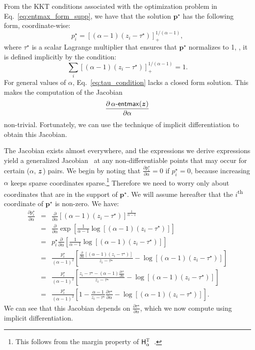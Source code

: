 From the KKT conditions associated with the optimization problem in
Eq.~\ref{eq:entmax_form_supp}, we have that the solution $\bm{p}^{\star}$ has the following form, coordinate-wise:
\begin{equation}\label{eq:p_kkt}
    p_i^{\star} = [(\alpha-1)(z_i - \tau^{\star})]_+^{1/(\alpha-1)},
\end{equation}
where $\tau^{\star}$ is a scalar Lagrange multiplier that ensures that
$\bm{p}^{\star}$ normalizes to 1, \ie, it is defined implicitly by the condition:
\begin{equation}\label{eq:tau_condition}
    \sum_i [(\alpha-1)(z_i - \tau^{\star})]_+^{1/(\alpha-1)} = 1.
\end{equation}
For general values of $\alpha$, Eq.~\ref{eq:tau_condition} lacks a closed form solution. This makes the computation of the
Jacobian
\begin{equation}
    \frac{\partial \mathop{\mathsf{\alpha}\textnormal{-}\mathsf{entmax}}(\bm{z})}{\partial \alpha}
\end{equation}
non-trivial. Fortunately, we can use the technique of implicit differentiation
to obtain this Jacobian.

The Jacobian exists almost everywhere, and the expressions we derive
expressions yield a generalized Jacobian~\citep{clarke_book} at any
non-differentiable points that may occur for certain ($\alpha$, $\bm{z}$)
pairs. We begin by noting that $\frac{\partial p_i^{\star}}{\partial
    \alpha} = 0$ if $p_i^{\star} = 0$, because increasing $\alpha$ keeps
sparse coordinates sparse.\footnote{This follows from the margin
    property of $\mathsf{H}^{\textsc{T}}_\alpha$~\citep{blondel2019learning}.}
Therefore we need to worry only
about coordinates that are in the support of $\bm{p}^\star$. We will assume
hereafter that the $i$\textsuperscript{th} coordinate of $\bm{p}^\star$ is non-zero.
We have:
\begin{eqnarray}\label{eq:gradient_alpha_01}
    \frac{\partial p_i^{\star}}{\partial \alpha} &=& \frac{\partial}{\partial \alpha} [(\alpha-1)(z_i - \tau^{\star})]^{\frac{1}{\alpha-1}}\nonumber\\
    &=& \frac{\partial}{\partial \alpha} \exp \left[\frac{1}{\alpha-1} \log [(\alpha-1)(z_i - \tau^{\star})]\right]\nonumber\\
    &=& p_i^{\star} \frac{\partial}{\partial \alpha} \left[\frac{1}{\alpha-1} \log [(\alpha-1)(z_i - \tau^{\star})]\right]\nonumber\\
    &=& \frac{p_i^{\star}}{(\alpha-1)^2} \left[\frac{\frac{\partial}{\partial \alpha} [(\alpha-1)(z_i - \tau^{\star})]}{z_i - \tau^{\star}} - \log[(\alpha-1)(z_i - \tau^{\star})] \right]\nonumber\\
    &=& \frac{p_i^{\star}}{(\alpha-1)^2} \left[\frac{z_i - \tau^{\star} - (\alpha-1)\frac{\partial \tau^{\star}}{\partial \alpha} }{z_i - \tau^{\star}} - \log[(\alpha-1)(z_i - \tau^{\star})] \right]\nonumber\\
    &=& \frac{p_i^{\star}}{(\alpha-1)^2} \left[1 - \frac{\alpha-1}{z_i - \tau^{\star}}\frac{\partial \tau^{\star}}{\partial \alpha} - \log[(\alpha-1)(z_i - \tau^{\star})] \right].
\end{eqnarray}
We can see that this Jacobian depends on $\frac{\partial \tau^{\star}}{\partial \alpha}$, which we now compute using implicit differentiation.

